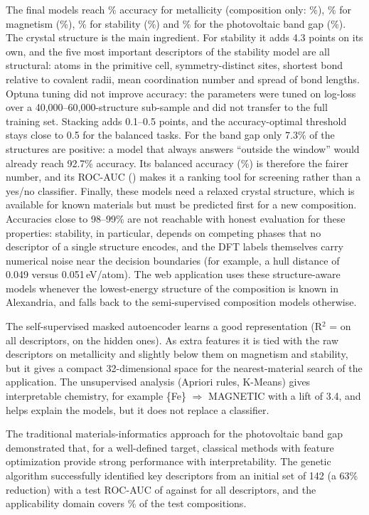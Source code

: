 
The final models reach \HAMetalAcc\% accuracy for metallicity (composition only:
\HAMetalBaseAcc\%), \HAMagAcc\% for magnetism (\HAMagBaseAcc\%), \HAStabAcc\% for stability
(\HAStabBaseAcc\%) and \HAGapAcc\% for the photovoltaic band gap (\HAGapBaseAcc\%).
The crystal structure is the main ingredient. For stability it adds 4.3 points on its own,
and the five most important descriptors of the stability model are all structural: atoms in
the primitive cell, symmetry-distinct sites, shortest bond relative to covalent radii, mean
coordination number and spread of bond lengths. Optuna tuning did not improve accuracy: the
parameters were tuned on log-loss over a 40,000--60,000-structure sub-sample and did not
transfer to the full training set. Stacking adds 0.1--0.5 points, and the accuracy-optimal
threshold stays close to 0.5 for the balanced tasks.
For the band gap only 7.3\% of the structures are positive: a model that always answers
``outside the window'' would already reach 92.7\% accuracy. Its balanced accuracy
(\HAGapBal\%) is therefore the fairer number, and its ROC-AUC (\HAGapAUC) makes it a ranking
tool for screening rather than a yes/no classifier. Finally, these models need a relaxed
crystal structure, which is available for known materials but must be predicted first for a
new composition. Accuracies close to 98--99\% are not reachable
with honest evaluation for these properties: stability, in particular, depends on competing
phases that no descriptor of a single structure encodes, and the DFT labels themselves carry
numerical noise near the decision boundaries (for example, a hull distance of 0.049 versus
0.051\,eV/atom). The web application uses these structure-aware models whenever the
lowest-energy structure of the composition is known in Alexandria, and falls back to the
semi-supervised composition models otherwise.

The self-supervised masked autoencoder learns a good representation (R$^2$ = \AERtwo{} on all
descriptors, \AERtwoMasked{} on the hidden ones). As extra features it is tied with the raw
descriptors on metallicity and slightly below them on magnetism and stability, but it gives a compact 32-dimensional space for the nearest-material search of
the application. The unsupervised analysis (Apriori rules, K-Means) gives interpretable
chemistry, for example \{Fe\} $\Rightarrow$ MAGNETIC with a lift of 3.4, and helps explain the
models, but it does not replace a classifier.

The traditional materials-informatics approach for the photovoltaic band gap demonstrated
that, for a well-defined target, classical methods with feature optimization provide strong
performance with interpretability. The genetic algorithm successfully identified \GAFinalN{}
key descriptors from an initial set of 142 (a 63\% reduction) with a test ROC-AUC of
\GapGAAUC{} against \GapAllAUC{} for all descriptors, and the applicability domain covers
\ADFracIn\% of the test compositions.

